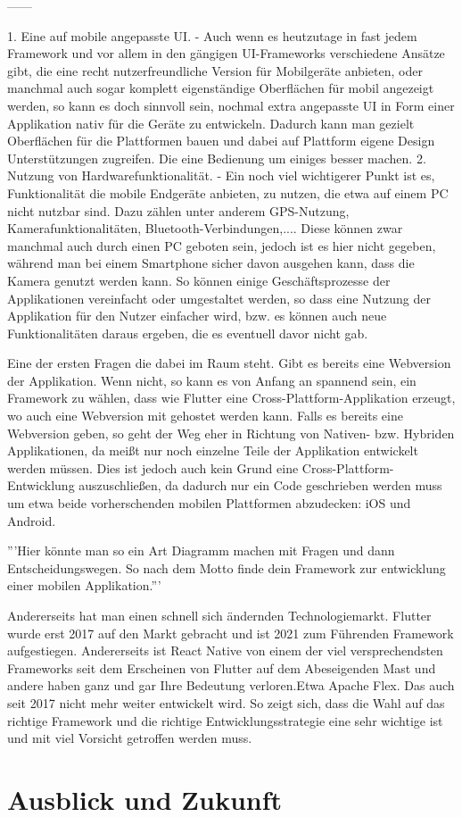 ------

1. Eine auf mobile angepasste UI. - Auch wenn es heutzutage in fast jedem Framework und vor allem in den gängigen UI-Frameworks verschiedene Ansätze gibt, die eine recht nutzerfreundliche Version für Mobilgeräte anbieten, oder manchmal auch sogar komplett eigenständige Oberflächen für mobil angezeigt werden, so kann es doch sinnvoll sein, nochmal extra angepasste UI in Form einer Applikation nativ für die Geräte zu entwickeln. Dadurch kann man gezielt Oberflächen für die Plattformen bauen und dabei auf Plattform eigene Design Unterstützungen zugreifen. Die eine Bedienung um einiges besser machen.
2. Nutzung von Hardwarefunktionalität. -  Ein noch viel wichtigerer Punkt ist es, Funktionalität die mobile Endgeräte anbieten, zu nutzen, die etwa auf einem PC nicht nutzbar sind. Dazu zählen unter anderem GPS-Nutzung, Kamerafunktionalitäten, Bluetooth-Verbindungen,.... Diese können zwar manchmal auch durch einen PC geboten sein, jedoch ist es hier nicht gegeben, während man bei einem Smartphone sicher davon ausgehen kann, dass die Kamera genutzt werden kann. So können einige Geschäftsprozesse der Applikationen vereinfacht oder umgestaltet werden, so dass eine Nutzung der Applikation für den Nutzer einfacher wird, bzw. es können auch neue Funktionalitäten daraus ergeben, die es eventuell davor nicht gab.


Eine der ersten Fragen die dabei im Raum steht. 
Gibt es bereits eine Webversion der Applikation.
Wenn nicht, so kann es von Anfang an spannend sein, ein Framework zu wählen, dass wie Flutter eine Cross-Plattform-Applikation erzeugt, wo auch eine Webversion mit gehostet werden kann.
Falls es bereits eine Webversion geben, so geht der Weg eher in Richtung von Nativen- bzw. Hybriden Applikationen, da meißt nur noch einzelne Teile der Applikation entwickelt werden müssen. Dies ist jedoch auch kein Grund eine Cross-Plattform-Entwicklung auszuschließen, da dadurch nur ein Code geschrieben werden muss um etwa beide vorherschenden mobilen Plattformen abzudecken: iOS und Android.

'''Hier könnte man so ein Art Diagramm machen mit Fragen und dann Entscheidungswegen. So nach dem Motto finde dein Framework zur entwicklung einer mobilen Applikation.'''


Andererseits hat man einen schnell sich ändernden Technologiemarkt. Flutter wurde erst 2017 auf den Markt gebracht und ist 2021 zum Führenden Framework aufgestiegen. Andererseits ist React Native von einem der viel versprechendsten Frameworks seit dem Erscheinen von Flutter auf dem Abeseigenden Mast und andere haben ganz und gar Ihre Bedeutung verloren.Etwa Apache Flex. Das auch seit 2017 nicht mehr weiter entwickelt wird. So zeigt sich, dass die Wahl auf das richtige Framework und die richtige Entwicklungsstrategie eine sehr wichtige ist und mit viel Vorsicht getroffen werden muss.
\section{Ausblick und Zukunft}